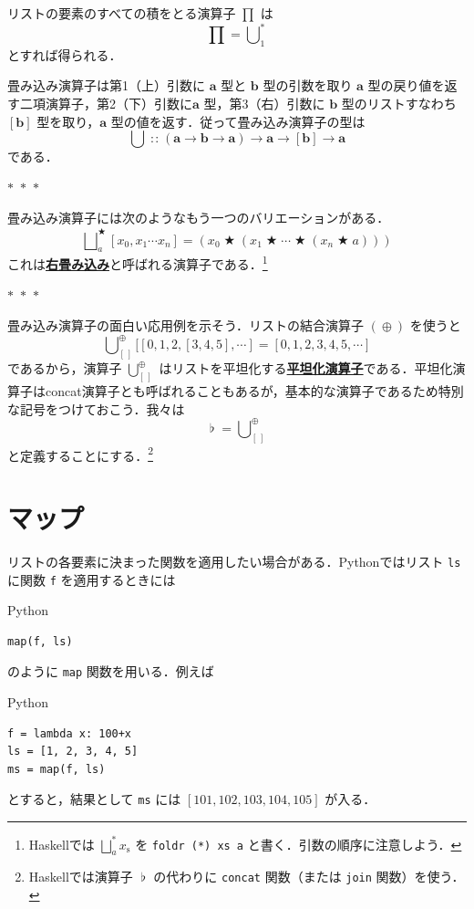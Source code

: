 \documentclass[a5paper,twoside,fleqn,draft]{jsbook}
\newcommand{\separator}{\begin{center}$*$~$*$~$*$\end{center}}
\newcommand{\programminglanguage}[1]{\textsf{#1}}
\newcommand{\haskell}{\programminglanguage{Haskell}}
\newcommand{\python}{\programminglanguage{Python}}
\newcommand{\keyword}[1]{{\underline{\textbf{#1}}}}
\newcommand{\code}[1]{\texttt{#1}}
\newenvironment{pythoncode}{\begin{itembox}[r]{\python}}{\end{itembox}}
\newcommand{\mEmptyList}{{[\,]}}
\DeclareMathOperator{\mAppend}{\oplus}
\DeclareMathOperator{\mBinOp}{\bigstar}
\DeclareMathOperator*{\mFold}{\bigcup}
\DeclareMathOperator*{\mFoldRight}{\bigsqcup}
\DeclareMathOperator{\mFuncArrow}{\rightarrow}
\DeclareMathOperator{\mIn}{{:\!:}}
\DeclareMathOperator{\mJoinList}{\flat} %
\newcommand{\mType}[1]{\mathbf{#1}} %
\newcommand{\mA}{\mType{a}}
\newcommand{\mB}{\mType{b}}
\newcommand{\mList}[1]{{#1}_\mathrm{s}}
\begin{document}
リストの要素のすべての積をとる演算子 $\prod$ は
\begin{equation}
  \prod
  =\mFold^*_1
\end{equation}
とすれば得られる．

畳み込み演算子は第1（上）引数に $\mA$ 型と $\mB$ 型の引数を取り $\mA$ 型の戻り値を返す二項演算子，第2（下）引数に$\mA$ 型，第3（右）引数に $\mB$ 型のリストすなわち$[\mB]$ 型を取り，$\mA$ 型の値を返す．従って畳み込み演算子の型は
\begin{equation}
  \mFold
  \mIn(\mA\mFuncArrow\mB\mFuncArrow\mA)
  \mFuncArrow\mA
  \mFuncArrow[\mB]
  \mFuncArrow\mA
\end{equation}
である．

\separator

畳み込み演算子には次のようなもう一つのバリエーションがある．
\begin{equation}
  \mFoldRight^{\mBinOp}_a[x_0,x_1\dotsb x_n]
  =(x_0\mBinOp(x_1\mBinOp\dotsb\mBinOp(x_n\mBinOp a)))
\end{equation}
これは\keyword{右畳み込み}と呼ばれる演算子である．\footnote{\haskell では $\mFoldRight^{*}_a\mList{x}$ を \code{foldr (*) xs a} と書く．引数の順序に注意しよう．}

\separator

畳み込み演算子の面白い応用例を示そう．リストの結合演算子 $(\mAppend)$ を使うと
\begin{equation}
  \mFold_\mEmptyList^{\mAppend}[[0,1,2,[3,4,5],\dotsb]
  =[0,1,2,3,4,5,\dotsb]
\end{equation}
であるから，演算子 $\mFold_\mEmptyList^{\mAppend}$ はリストを平坦化する\keyword{平坦化演算子}である．平坦化演算子はconcat演算子とも呼ばれることもあるが，基本的な演算子であるため特別な記号をつけておこう．我々は
\begin{equation}
  \mJoinList
  =\mFold_\mEmptyList^{\mAppend}
\end{equation}
と定義することにする．\footnote{\haskell では演算子 $\mJoinList$ の代わりに \code{concat} 関数（または \code{join} 関数）を使う．}

\section{マップ}

リストの各要素に決まった関数を適用したい場合がある．\python ではリスト \code{ls} に関数 \code{f} を適用するときには
\begin{pythoncode}
\begin{verbatim}
map(f, ls)
\end{verbatim}
\end{pythoncode}
のように \code{map} 関数を用いる．例えば
\begin{pythoncode}
\begin{verbatim}
f = lambda x: 100+x
ls = [1, 2, 3, 4, 5]
ms = map(f, ls)
\end{verbatim}
\end{pythoncode}
とすると，結果として \code{ms} には $[101,102,103,104,105]$ が入る．
\end{document}
